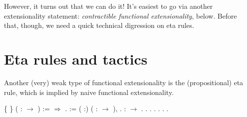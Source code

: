 \documentclass[12pt]{report}
\begin{document}
   However, it turns out that we can do it!  It’s easiest to go via another extensionality statement: \textit{contractible functional extensionality},  below.  Before that, though, we need a quick technical digression on eta rules. \begin{coqdoccode}
\coqdocemptyline
\end{coqdoccode}
\section{Eta rules and tactics}

\begin{coqdoccode}
\coqdocemptyline
\end{coqdoccode}
Another (very) weak type of functional extensionality is the
   (propositional) eta rule, which is implied by naive functional
   extensionality. \begin{coqdoccode}
\coqdocemptyline
\coqdocnoindent
{}  \{ \} ( :  \ensuremath{\rightarrow} ) :=\coqdoceol
\coqdocindent{1.00em}
  \ensuremath{\Rightarrow}  .\coqdoceol
\coqdocemptyline
\coqdocnoindent
{}  :=\coqdoceol
\coqdocindent{1.00em}
\coqdockw{\ensuremath{\forall}} ( :) ( :  \ensuremath{\rightarrow} ),    .\coqdoceol
\coqdocemptyline
\coqdocnoindent
{}  :  \ensuremath{\rightarrow} .\coqdoceol
\coqdocnoindent
{}.\coqdoceol
\coqdocindent{1.00em}
    .\coqdoceol
\coqdocindent{1.00em}
 .\coqdoceol
\coqdocindent{1.00em}
 .\coqdoceol
\coqdocindent{1.00em}
.\coqdoceol
\coqdocnoindent
{}.\coqdoceol
\coqdocemptyline
\end{coqdoccode}
\end{document}
